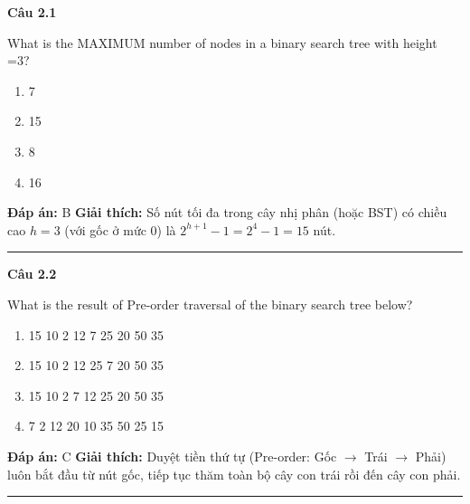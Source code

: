 \documentclass[11pt,a4paper]{article}
\newenvironment{question}[1]{%
  \par\vspace{1em}\noindent\textbf{\large Câu #1}\par\vspace{0.4em}
}{%
  \par\vspace{1em}\hrule\vspace{0.6em}
}
\newenvironment{choices}{%
  \begin{enumerate}[label=\textbf{\Alph*.},leftmargin=2.2em,itemsep=2pt,topsep=3pt]
}{%
  \end{enumerate}
}
\newcommand{\choice}{\item}
\begin{document}
\begin{question}{2.1}
What is the MAXIMUM number of nodes in a binary search tree with height =3?
\begin{choices}
\choice 7
\choice 15
\choice 8
\choice 16
\end{choices}
\textbf{Đáp án:} B
\textbf{Giải thích:} Số nút tối đa trong cây nhị phân (hoặc BST) có chiều cao $h = 3$ (với gốc ở mức 0) là $2^{h+1} - 1 = 2^4 - 1 = 15$ nút.
\end{question}

\begin{question}{2.2}
What is the result of Pre-order traversal of the binary search tree below?
\begin{center}
\end{center}
\begin{choices}
\choice 15 10 2 12 7 25 20 50 35
\choice 15 10 2 12 25 7 20 50 35
\choice 15 10 2 7 12 25 20 50 35
\choice 7 2 12 20 10 35 50 25 15
\end{choices}
\textbf{Đáp án:} C
\textbf{Giải thích:} Duyệt tiền thứ tự (Pre-order: Gốc $\to$ Trái $\to$ Phải) luôn bắt đầu từ nút gốc, tiếp tục thăm toàn bộ cây con trái rồi đến cây con phải.
\end{question}
\end{document}
